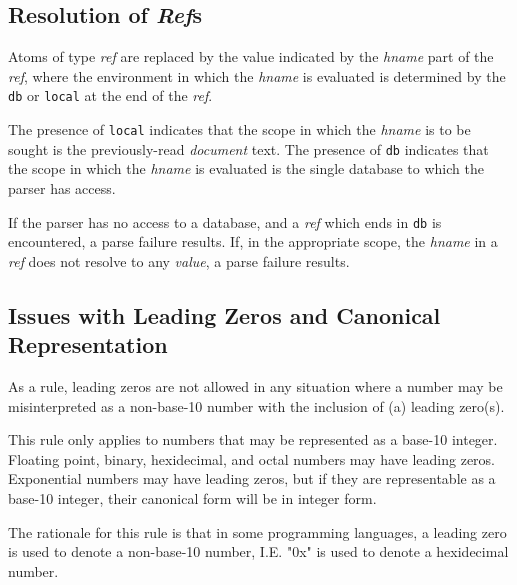 \documentclass{article}
\begin{document}
        \subsection{Resolution of \emph{Ref}s\label{sec:refs}}
                Atoms of type \emph{ref} are replaced
                by the value indicated by the \emph{hname} part of the \emph{ref},
                where the environment in which the \emph{hname} is evaluated is determined
                by the \texttt{db} or \texttt{local} at the end of the \emph{ref}.
                \vspace{1mm}
                \par
                The presence of \texttt{local} indicates 
                that the scope in which the \emph{hname} is to be sought
                is the previously-read \emph{document} text.
                The presence of 
                \texttt{db} indicates
                that the scope in which the \emph{hname} is evaluated
                is the single database
                to which the parser has access.
                \vspace{1mm}
                \par
                If the parser has no access to a database,
                and a \emph{ref} which ends in \texttt{db} is encountered,
                a parse failure results.
                If,
                in the appropriate scope,
                the \emph{hname} in a \emph{ref} does not resolve to any \emph{value},
                a parse failure results.
        \subsection{Issues with Leading Zeros and Canonical Representation}
                As a rule, leading zeros are not allowed
                in any situation where a number may be misinterpreted as a non-base-10 number
                with the inclusion of (a) leading zero(s).
                \par
                This rule only applies to numbers that may be represented as a base-10 integer.
                Floating point, binary, hexidecimal, and octal numbers may have leading zeros.
                Exponential numbers may have leading zeros, but if they are representable as a base-10 integer,
                their canonical form will be in integer form.
                \par
                The rationale for this rule is that in some programming languages,
                a leading zero is used to denote a non-base-10 number,
                I.E. "0x" is used to denote a hexidecimal number.       
\end{document}
